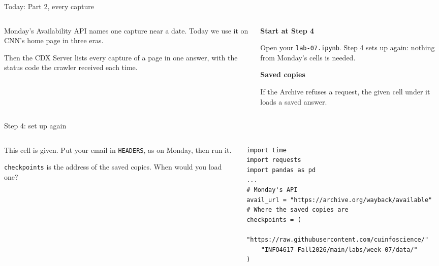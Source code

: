 \documentclass[9pt,aspectratio=169]{beamer}
\begin{document}
\begin{frame}{Today: Part 2, every capture}
    \begin{columns}[T]
        \begin{column}{0.6\textwidth}
            Monday's Availability API names one capture near a date. Today we use it on CNN's home page in three eras.

            \medskip
            Then the CDX Server lists every capture of a page in one answer, with the status code the crawler received each time.
        \end{column}
        \begin{column}{0.35\textwidth}
            \textbf{Start at Step 4}\\[2pt]
            {\footnotesize Open your \texttt{lab-07.ipynb}. Step 4 sets up again: nothing from Monday's cells is needed.\par}
            \medskip
            \textbf{Saved copies}\\[2pt]
            {\footnotesize If the Archive refuses a request, the given cell under it loads a saved answer.\par}
        \end{column}
    \end{columns}
\end{frame}

\begin{frame}[fragile]{Step 4: set up again}
    \begin{columns}[T]
        \begin{column}{0.37\textwidth}
            This cell is given. Put your email in \texttt{HEADERS}, as on Monday, then run it.

            \medskip
            \texttt{checkpoints} is the address of the saved copies. When would you load one?
        \end{column}
        \begin{column}{0.6\textwidth}
\begin{lstlisting}
import time
import requests
import pandas as pd
...
# Monday's API
avail_url = "https://archive.org/wayback/available"
# Where the saved copies are
checkpoints = (
    "https://raw.githubusercontent.com/cuinfoscience/"
    "INFO4617-Fall2026/main/labs/week-07/data/"
)
\end{lstlisting}
        \end{column}
    \end{columns}
\end{frame}
\end{document}
